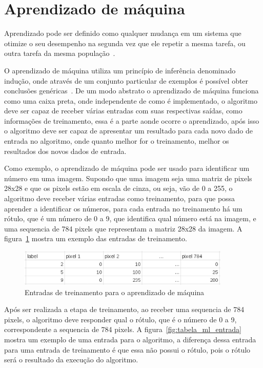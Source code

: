\section{Aprendizado de máquina}

Aprendizado pode ser definido como qualquer mudança em um sistema que
otimize o seu desempenho na segunda vez que ele repetir a mesma tarefa,
ou outra tarefa da mesma população~\cite{custodio2010aprendizadomaquina}.

O aprendizado de máquina utiliza um princípio de inferência denominado
indução, onde através de um conjunto particular de exemplos é possível
obter conclusões genéricas~\cite{bruno2010aprendizadomaquina}. De um modo
abstrato o aprendizado de máquina funciona como uma caixa preta, onde
independente de como é implementado, o algoritmo deve ser capaz de receber
várias entradas com suas respectivas saídas, como informações de treinamento,
essa é a parte aonde ocorre o aprendizado, após isso o algoritmo deve
ser capaz de apresentar um resultado para cada novo dado de entrada no
algoritmo, onde quanto melhor for o treinamento, melhor os resultados
dos novos dados de entrada.

Como exemplo, o aprendizado de máquina pode ser usado para identificar
um número em uma imagem. Supondo que uma imagem seja uma matriz de pixels
28x28 e que os pixels estão em escala de cinza, ou seja, vão de 0 a 255,
o algoritmo deve receber várias entradas como treinamento, para que possa
aprender a identificar os números, para cada entrada no treinamento há um
rótulo, que é um número de 0 a 9, que identifica qual número está na imagem,
e uma sequencia de 784 pixels que representam a matriz 28x28 da imagem.
A figura~\ref{fig:tabela_ml_treinamento} mostra um exemplo das entradas de
treinamento.

\begin{figure}[h]
  \centering
  \includegraphics[width=0.9\textwidth]{figuras/tabela_ml_treinamento.eps}
  \caption{Entradas de treinamento para o aprendizado de máquina}
  \label{fig:tabela_ml_treinamento}
\end{figure}

Após ser realizada a etapa de treinamento, ao receber uma sequencia de 784
pixels, o algoritmo deve responder qual o rótulo, que é o número de 0 a 9,
correspondente a sequencia de 784 pixels. A figura~\ref{fig:tabela_ml_entrada}
mostra um exemplo de uma entrada para o algoritmo, a diferença dessa entrada
para uma entrada de treinamento é que essa não possui o rótulo, pois o rótulo
será o resultado da execução do algoritmo.

